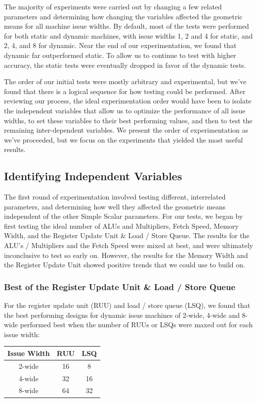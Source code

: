 \documentclass[paper=a4, fontsize=12pt]{scrartcl} %
\numberwithin{equation}{section} %
\numberwithin{figure}{section} %
\numberwithin{table}{section} %
\begin{document}
The majority of experiments were carried out by changing a few related parameters and determining how changing the variables affected the geometric means for all machine issue widths. By default, most of the tests were performed for both static and dynamic machines, with issue widths 1, 2 and 4 for static, and 2, 4, and 8 for dynamic. Near the end of our experimentation, we found that dynamic far outperformed static. To allow us to continue to test with higher accuracy, the static tests were eventually dropped in favor of the dynamic tests.

The order of our initial tests were mostly arbitrary and experimental, but we've found that there is a logical sequence for how testing could be performed. After reviewing our process, the ideal experimentation order would have been to isolate the independent variables that allow us to optimize the performance of all issue widths, to set these variables to their best performing values, and then to test the remaining inter-dependent variables. We present the order of experimentation as we've proceeded, but we focus on the experiments that yielded the most useful results.

\subsection{Identifying Independent Variables}

The first round of experimentation involved testing different, interrelated parameters, and determining how well they affected the geometric means independent of the other Simple Scalar parameters. For our tests, we began by first testing the ideal number of ALUs and Multipliers, Fetch Speed, Memory Width, and the Register Update Unit \& Load / Store Queue. The results for the ALU's / Multipliers and the Fetch Speed were mixed at best, and were ultimately inconclusive to test so early on. However, the results for the Memory Width and the Register Update Unit showed positive trends that we could use to build on.

\subsubsection{Best of the Register Update Unit \& Load / Store Queue}

For the register update unit (RUU) and load / store queue (LSQ), we found that the best performing designs for dynamic issue machines of 2-wide, 4-wide and 8-wide performed best when the number of RUUs or LSQs were maxed out for each issue width:
\begin{center}
\begin{tabular}{ |c|c|c| } 
	\hline
	Issue Width & RUU & LSQ  \\ \hline
	2-wide & 16 & 8 \\ \hline
	4-wide & 32 & 16 \\ \hline
	8-wide & 64 & 32 \\ \hline
\end{tabular}
\end{center}
\end{document}
